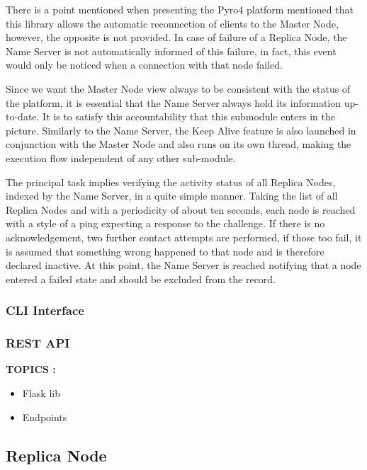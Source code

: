 There is a point mentioned when presenting the Pyro4 platform mentioned that this library allows the automatic reconnection of clients to the Master Node, however, the opposite is not provided. In case of failure of a Replica Node, the Name Server is not automatically informed of this failure, in fact, this event would only be noticed when a connection with that node failed.

Since we want the Master Node view always to be consistent with the status of the platform, it is essential that the Name Server always hold its information up-to-date. It is to satisfy this accountability that this submodule enters in the picture. Similarly to the Name Server, the Keep Alive feature is also launched in conjunction with the Master Node and also runs on its own thread, making the execution flow independent of any other sub-module.

The principal task implies verifying the activity status of all Replica Nodes, indexed by the Name Server, in a quite simple manner. Taking the list of all Replica Nodes and with a periodicity of about ten seconds, each node is reached with a style of a ping expecting a response to the challenge. If there is no acknowledgement, two further contact attempts are performed, if those too fail, it is assumed that something wrong happened to that node and is therefore declared inactive. At this point, the Name Server is reached notifying that a node entered a failed state and should be excluded from the record. 

\subsubsection{CLI Interface}
\label{subsub:rep_cli_interface}


\subsubsection{REST API}
\label{subsub:rep_restapi}
\textbf{TOPICS :}
\begin{itemize}
	\item Flask lib
	\item Endpoints
\end{itemize}


\subsection{Replica Node}
\label{sub:rep_replica_node}

